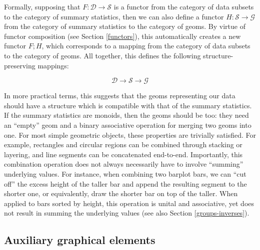 \documentclass[
  openany]{book}
\theoremstyle{definition}
\theoremstyle{definition}
\theoremstyle{definition}
\theoremstyle{definition}
\theoremstyle{remark}
\begin{document}
Formally, supposing that \(F: \mathcal{D} \to \mathcal{S}\) is a functor from the category of data subsets to the category of summary statistics, then we can also define a functor \(H: \mathcal{S} \to \mathcal{G}\) from the category of summary statistics to the category of geoms. By virtue of functor composition (see Section \ref{functors}), this automatically creates a new functor \(F ;H\), which corresponds to a mapping from the category of data subsets to the category of geoms. All together, this defines the following structure-preserving mappings:

\[\mathcal{D} \to \mathcal{S} \to \mathcal{G}\]

In more practical terms, this suggests that the geoms representing our data should have a structure which is compatible with that of the summary statistics. If the summary statistics are monoids, then the geoms should be too: they need an ``empty'' geom and a binary associative operation for merging two geoms into one. For most simple geometric objects, these properties are trivially satisfied. For example, rectangles and circular regions can be combined through stacking or layering, and line segments can be concatenated end-to-end. Importantly, this combination operation does not always necessarily have to involve ``summing'' underlying values. For instance, when combining two barplot bars, we can ``cut off'' the excess height of the taller bar and append the resulting segment to the shorter one, or equivalently, draw the shorter bar on top of the taller. When applied to bars sorted by height, this operation is unital and associative, yet does not result in summing the underlying values (see also Section \ref{groups-inverses}).

\subsection{Auxiliary graphical elements}\label{auxiliary-elements}
\end{document}
